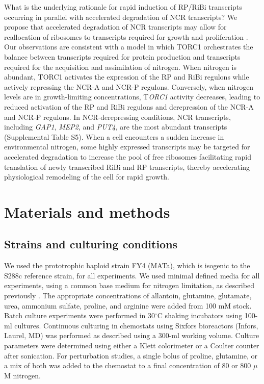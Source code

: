 What is the underlying rationale
for rapid induction of RP/RiBi transcripts occurring in parallel with
accelerated degradation of NCR transcripts? We propose that
accelerated degradation of NCR transcripts may allow for reallocation
of ribosomes to transcripts required for growth and proliferation
\parencite{kief1981coordinate,lee2011dynamic}. Our observations are
consistent with a model in which TORC1 orchestrates the balance
between transcripts required for protein production and transcripts
required for the acquisition and assimilation of nitrogen. When
nitrogen is abundant, TORC1 activates the expression of the RP and
RiBi regulons while actively repressing the NCR-A and NCR-P regulons.
Conversely, when nitrogen levels are in growth-limiting
concentrations, T\textit{ORC1} activity decreases, leading to reduced
activation of the RP and RiBi regulons and derepression of the NCR-A
and NCR-P regulons. In NCR-derepressing conditions, NCR transcripts,
including \textit{GAP1}, \textit{MEP2}, and \textit{PUT4}, 
are the most abundant transcripts
(Supplemental Table S5). When a cell encounters a sudden increase in
environmental nitrogen, some highly expressed transcripts may be
targeted for accelerated degradation to increase the pool of free
ribosomes facilitating rapid translation of newly transcribed RiBi and
RP transcripts, thereby accelerating physiological remodeling of the
cell for rapid growth.  

\section{Materials and methods}

\subsection{Strains and culturing conditions}

We used the prototrophic haploid strain FY4 (MATa), which
is isogenic to the S288c reference strain, for all experiments. We
used minimal defined media for all experiments, using a common base
medium for nitrogen limitation, as described previously 
\parencite{brauer2008coordination,boer2010growth}. The appropriate concentrations of
allantoin, glutamine, glutamate, urea, ammonium sulfate, proline, and
arginine were added from 100 mM stock. Batch culture experiments were
performed in 30$^{\circ}$C shaking incubators using 100-ml cultures. Continuous
culturing in chemostats using Sixfors bioreactors (Infors, Laurel, MD)
was performed as described 
\parencite{brauer2008coordination,boer2010growth}
using a 300-ml working volume. Culture parameters were determined
using either a Klett colorimeter or a Coulter counter after
sonication. For perturbation studies, a single bolus of proline,
glutamine, or a mix of both was added to the chemostat to a final
concentration of 80 or 800 $\mu$M nitrogen.  

